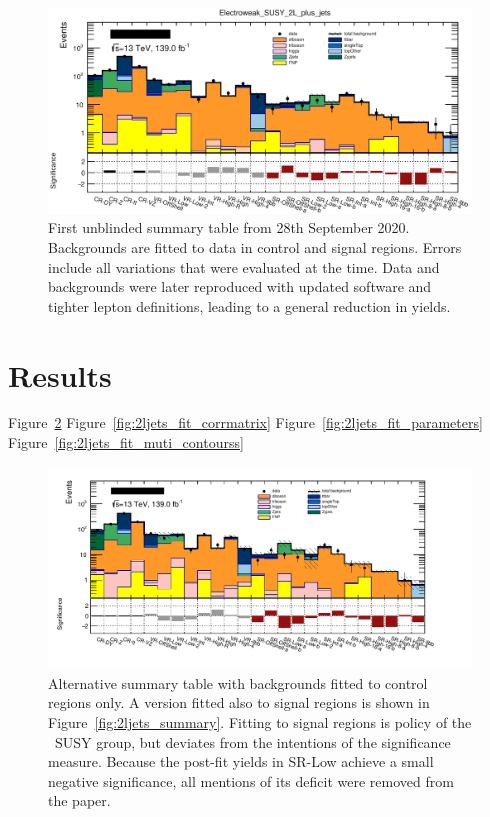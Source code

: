 \begin{figure}[tp]
\centering
\includegraphics[width=\textwidth]{figures/2ljets_summary_unblinding_log.png}
\caption[
First unblinded summary table from 28th September 2020
]{%
First unblinded summary table from 28th September 2020.
Backgrounds are fitted to data in control and signal regions.
Errors include all variations that were evaluated at the time.
Data and backgrounds were later reproduced with updated software and tighter
lepton definitions, leading to a general reduction in yields.
}
\label{fig:2ljets_summary_unblinding}
\end{figure}


\section{Results}

Figure~\ref{fig:2ljets_summary_no_sr}
Figure~\ref{fig:2ljets_fit_corrmatrix}
Figure~\ref{fig:2ljets_fit_parameters}
Figure~\ref{fig:2ljets_fit_muti_contourss}

\begin{figure}[tp]
\centering
\includegraphics[width=\textwidth]{figures/2ljets_summary_no_sr_log.png}
\caption[
Alternative summary table with backgrounds fitted to control regions only
]{%
Alternative summary table with backgrounds fitted to control regions only.
A version fitted also to signal regions is shown in
Figure~\ref{fig:2ljets_summary}.
Fitting to signal regions is policy of the \atlas\ SUSY group, but deviates
from the intentions of the significance measure.
Because the post-fit yields in SR-Low achieve a small negative significance,
all mentions of its deficit were removed from the paper.
}
\label{fig:2ljets_summary_no_sr}
\end{figure}

